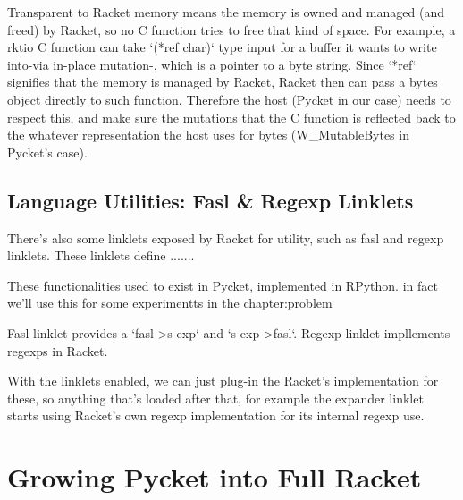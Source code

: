 				\begin{paragraph-here}%
					Transparent to Racket memory means the memory is owned and managed (and freed) by Racket, so no C function tries to free that kind of space. For example, a rktio C function can take `(*ref char)` type input for a buffer it wants to write into-via in-place mutation-, which is a pointer to a byte string. Since `*ref` signifies that the memory is managed by Racket, Racket then can pass a bytes object directly to such function. Therefore the host (Pycket in our case) needs to respect this, and make sure the mutations that the C function is reflected back to the whatever representation the host uses for bytes (W\_MutableBytes in Pycket's case).
				\end{paragraph-here}

		\subsection{Language Utilities: Fasl \& Regexp Linklets}

			\begin{paragraph-here}%
				There's also some linklets exposed by Racket for utility, such as fasl and regexp linklets. These linklets define .......
			\end{paragraph-here}

			\begin{paragraph-here}%
				These functionalities used to exist in Pycket, implemented in RPython. in fact we'll use this for some experimentts in the chapter:problem
			\end{paragraph-here}

			\begin{paragraph-here}%
				Fasl linklet provides a `fasl->s-exp` and `s-exp->fasl`. Regexp linklet impllements regexps in Racket.
			\end{paragraph-here}

			\begin{paragraph-here}%
				With the linklets enabled, we can just plug-in the Racket's implementation for these, so anything that's loaded after that, for example the expander linklet starts using Racket's own regexp implementation for its internal regexp use.
			\end{paragraph-here}

	\section[\texorpdfstring{Growing Pycket into Full Racket}{Pycket as Full Racket}]{Growing Pycket into Full Racket}

